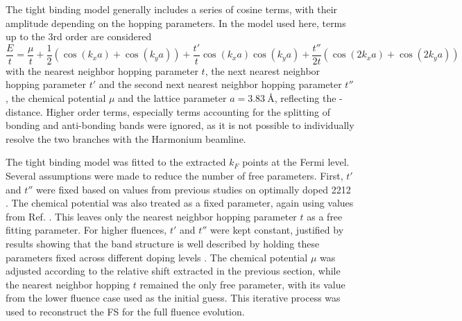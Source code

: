 The tight binding model generally includes a series of cosine terms, with their amplitude depending on the hopping parameters.
In the model used here, terms up to the 3rd order are considered
\begin{equation}
	\frac{E}{t} = \frac{\mu}{t} + \frac{1}{2} \left(\cos(k_xa)+\cos(k_ya)\right) + \frac{t'}{t} \cos(k_xa)\cos(k_ya) + \frac{t''}{2t} \left(\cos(2k_xa)+\cos(2k_ya)\right)
\end{equation}
with the nearest neighbor hopping parameter $t$, the next nearest neighbor hopping parameter $t'$ and the second next nearest neighbor hopping parameter $t''$, the chemical potential $\mu$ and the lattice parameter $a=\qty{3.83}{\angstrom}$, reflecting the - distance.
Higher order terms, especially terms accounting for the splitting of bonding and anti-bonding bands were ignored, as it is not possible to individually resolve the two branches with the Harmonium beamline.

The tight binding model was fitted to the extracted $k_F$ points at the Fermi level.
Several assumptions were made to reduce the number of free parameters.
First, $t'$ and $t''$ were fixed based on values from previous studies on optimally doped 2212 \cite{kondo_hole-concentration_2004}.
The chemical potential was also treated as a fixed parameter, again using values from Ref. \cite{kondo_hole-concentration_2004}.
This leaves only the nearest neighbor hopping parameter $t$ as a free fitting parameter.
For higher fluences, $t'$ and $t''$ were kept constant, justified by results showing that the band structure is well described by holding these parameters fixed across different doping levels \cite{drozdov_phase_2018}.
The chemical potential $\mu$ was adjusted according to the relative shift extracted in the previous section, while the nearest neighbor hopping $t$ remained the only free parameter, with its value from the lower fluence case used as the initial guess.
This iterative process was used to reconstruct the FS for the full fluence evolution.

